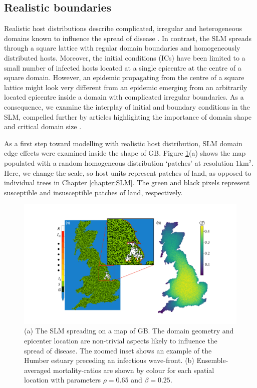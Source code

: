 \subsection{Realistic boundaries}

Realistic host distributions describe complicated, irregular and heterogeneous domains
known to influence the spread of disease \cite{madden1995plant}.
In contrast, the SLM spreads through a square lattice with regular domain boundaries and homogeneously distributed hosts.
Moreover, the initial conditions (ICs) have been limited to a small number of infected hosts
located at a single epicentre at the centre of a square domain.
However, an epidemic propagating from the centre of a square lattice might look very different
from an epidemic emerging from an arbitrarily located epicentre inside a domain with complicated irregular boundaries.
As a consequence, we examine the interplay of initial and boundary conditions in the SLM,
compelled further by articles highlighting the importance of domain shape \cite{mikaberidze2016invasiveness} and critical domain size \cite{abad2020reaction, reimer2017critical}.

As a first step toward modelling with realistic host distribution,
SLM domain edge effects were examined inside the shape of GB.
Figure \ref{fig:uk-spread-primer}(a) shows the map populated 
with a random homogeneous distribution `patches' at resolution $1\mathrm{km^2}$. 
Here, we change the scale, so host units represent patches of land, 
as opposed to individual trees in Chapter \ref{chapter:SLM}.
The green and black pixels represent susceptible and insusceptible patches of land, respectively.

\begin{figure}
    \centering
    \includegraphics[scale=0.32]{chapter4/figures/figure1-GB-BCs.pdf}
    \caption{(a) The SLM spreading on a map of GB. The domain geometry and epicenter %
    location are non-trivial aspects likely to influence the spread of disease. The zoomed inset %
    shows an example of the Humber estuary preceding an infectious wave-front. 
    (b) Ensemble-averaged mortality-ratios are shown by colour for each spatial location with 
        parameters $\rho=0.65$ and $\beta=0.25$.}
    \label{fig:uk-spread-primer}
\end{figure}


